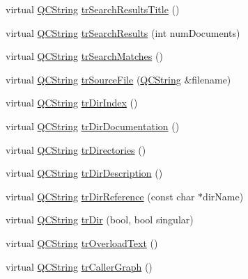 \begin{DoxyCompactItemize}
\item 
virtual \mbox{\hyperlink{class_q_c_string}{Q\+C\+String}} \mbox{\hyperlink{class_translator_korean_aa8be7c0f7412661dc5ae06c1772806f7}{tr\+Search\+Results\+Title}} ()
\item 
virtual \mbox{\hyperlink{class_q_c_string}{Q\+C\+String}} \mbox{\hyperlink{class_translator_korean_a3ee64a5e4635a5d9a428a0d8acfcf0ea}{tr\+Search\+Results}} (int num\+Documents)
\item 
virtual \mbox{\hyperlink{class_q_c_string}{Q\+C\+String}} \mbox{\hyperlink{class_translator_korean_a14a41f288f48978a6c8c193494818f32}{tr\+Search\+Matches}} ()
\item 
virtual \mbox{\hyperlink{class_q_c_string}{Q\+C\+String}} \mbox{\hyperlink{class_translator_korean_ad43b7a8eaf87e6687c829e6bc4b5b81c}{tr\+Source\+File}} (\mbox{\hyperlink{class_q_c_string}{Q\+C\+String}} \&filename)
\item 
virtual \mbox{\hyperlink{class_q_c_string}{Q\+C\+String}} \mbox{\hyperlink{class_translator_korean_a5c4fd5ffbb44f7651f9808b7ca324d1b}{tr\+Dir\+Index}} ()
\item 
virtual \mbox{\hyperlink{class_q_c_string}{Q\+C\+String}} \mbox{\hyperlink{class_translator_korean_ade40cfebcc4dd63032402d8fab3dcd66}{tr\+Dir\+Documentation}} ()
\item 
virtual \mbox{\hyperlink{class_q_c_string}{Q\+C\+String}} \mbox{\hyperlink{class_translator_korean_aaf735e849b61302e9546a94fb545ca0e}{tr\+Directories}} ()
\item 
virtual \mbox{\hyperlink{class_q_c_string}{Q\+C\+String}} \mbox{\hyperlink{class_translator_korean_a13c051ef5bb44c97e07ab91715858b92}{tr\+Dir\+Description}} ()
\item 
virtual \mbox{\hyperlink{class_q_c_string}{Q\+C\+String}} \mbox{\hyperlink{class_translator_korean_aacccc418b93495543610b3df476d404f}{tr\+Dir\+Reference}} (const char $\ast$dir\+Name)
\item 
virtual \mbox{\hyperlink{class_q_c_string}{Q\+C\+String}} \mbox{\hyperlink{class_translator_korean_a86717f83e00ae8877bf9bae2b41772dd}{tr\+Dir}} (bool, bool singular)
\item 
virtual \mbox{\hyperlink{class_q_c_string}{Q\+C\+String}} \mbox{\hyperlink{class_translator_korean_a02a2526670077f9d12f2c16dd836e4ed}{tr\+Overload\+Text}} ()
\item 
virtual \mbox{\hyperlink{class_q_c_string}{Q\+C\+String}} \mbox{\hyperlink{class_translator_korean_a5758b71ecd43c86e70bc4879f65e0067}{tr\+Caller\+Graph}} ()
\item 

\end{DoxyCompactItemize}
